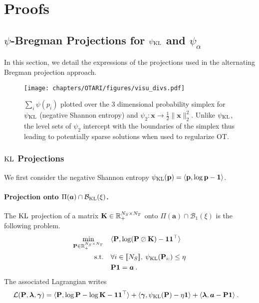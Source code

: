 

\section{Proofs}

\subsection{$\psi$-Bregman Projections for $\psi_{\operatorname{KL}}$ and $\psi_{\alpha}$}\label{sec:proof_projs}

    In this section, we detail the expressions of the projections used in the alternating Bregman projection approach.

    \begin{figure*}[t]
        \begin{center}
        \centerline{\texttt{[image: chapters/OTARI/figures/visu\_divs.pdf]}}
        \caption{$\sum_i \psi(p_i)$ plotted over the 3 dimensional probability simplex for $\psi_{\operatorname{KL}}$ (negative Shannon entropy) and $\psi_2 : \bm{x} \to \frac{1}{2} \| \bm{x} \|^2_2$. Unlike $\psi_{\operatorname{KL}}$, the level sets of $\psi_2$ intercept with the boundaries of the simplex thus leading to potentially sparse solutions when used to regularize OT.}
        \label{fig:Ps_vs_Pse}
        \end{center}
    \end{figure*}
    
    \subsubsection{$\operatorname{KL}$ Projections}

    We first consider the negative Shannon entropy $\psi_{\operatorname{KL}}({\mathbf{p}}) = \langle {\mathbf{p}} , \log {\mathbf{p}} - \bm{1} \rangle$.

    \paragraph{Projection onto $\Pi(\bm{a}) \cap \mathcal{B}_{\operatorname{KL}}(\xi)$.}
    The $\operatorname{KL}$ projection of a matrix ${\mathbf{K}} \in \mathbb{R}_+^{N_S \times N_T}$ onto $\Pi(\bm{a}) \cap \mathcal{B}_1(\xi)$ is the following problem.
    \begin{align}
        \min_{{\mathbf{P}} \in \mathbb{R}_+^{N_S \times N_T}} \quad &\langle {\mathbf{P}}, \log ({\mathbf{P}} \oslash {\mathbf{K}}) - \bm{1}\bm{1}^\top \rangle \\
        \text{s.t.} \quad &\forall i \in {[\![N_S]\!]}, \: \psi_{\operatorname{KL}}({\mathbf{P}}_{i:}) \leq \eta \\
        & {\mathbf{P}} \bm{1} = \bm{a} \:.
    \end{align}
    The associated Lagrangian writes
    \begin{align}
        \mathcal{L}({\mathbf{P}}, \bm{\lambda}, \bm{\gamma}) &= \langle {\mathbf{P}}, \log {\mathbf{P}} - \log {\mathbf{K}} - \bm{1}\bm{1}^\top \rangle + \langle \bm{\gamma}, \psi_{\operatorname{KL}}({\mathbf{P}}) - \eta \bm{1}\rangle + \langle \bm{\lambda}, \bm{a} - {\mathbf{P}} \bm{1} \rangle \:.
    \end{align}
    
